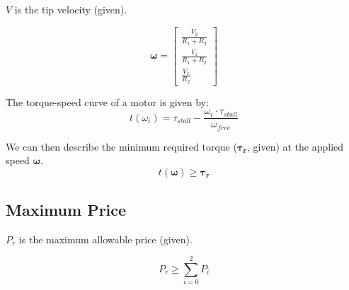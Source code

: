 \documentclass{article}
\begin{document}
$V$ is the tip velocity (given).

\begin{equation}
    \boldsymbol{\omega} =
    \begin{bmatrix}
        \frac{V_y}{R_1 + R_2} \\[6pt]
        \frac{V_z}{R_1 + R_2} \\[6pt]
        \frac{V_z}{R_2}
    \end{bmatrix}
\end{equation}

The torque-speed curve of a motor is given by:
\begin{equation}
    t(\omega_i) = \tau_{stall} - \frac{\omega_i \cdot \tau_{stall}}{\omega_{free}}
\end{equation}

We can then describe the minimum required torque ($\boldsymbol{\tau_r}$, given) at the applied speed
$\boldsymbol{\omega}$.
\begin{equation}
    t(\boldsymbol{\omega}) \geq \boldsymbol{\tau_r}
\end{equation}

\FloatBarrier
\subsection{Maximum Price}

$P_r$ is the maximum allowable price (given).

\begin{equation}
    P_r \geq \sum_{i=0}^{2}{P_i}
\end{equation}
\end{document}
